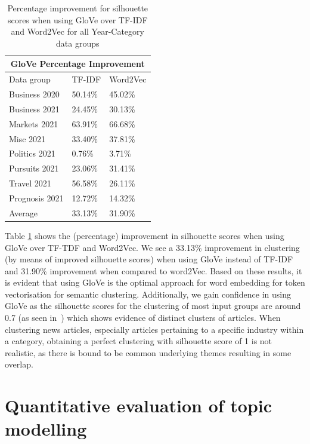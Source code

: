 \begin{table}
\centering
\renewcommand{\arraystretch}{1.05}
\begin{tabularx}{0.7\textwidth}{X X X} 
\multicolumn{3}{c}{GloVe Percentage Improvement} \\
 \hline
 Data group & TF-IDF & Word2Vec \\
 \hline
 Business 2020 & 50.14\% & 45.02\%  \\ 
 Business 2021 & 24.45\% & 30.13\%  \\
 Markets 2021 & 63.91\% & 66.68\% \\
 Misc 2021 & 33.40\% & 37.81\% \\
 Politics 2021 & 0.76\% & 3.71\% \\
 Pursuits 2021 & 23.06\% & 31.41\%  \\ 
 Travel 2021 & 56.58\% & 26.11\% \\
 Prognosis 2021 & 12.72\% & 14.32\% \\ 
 \hline
 Average & 33.13\% & 31.90\% \\ 
\end{tabularx}
\caption{Percentage improvement for silhouette scores when using GloVe over TF-IDF and Word2Vec for all Year-Category data groups}
\label{table:word_embed}
\end{table}

Table \ref{table:word_embed} shows the (percentage) improvement in silhouette scores when using GloVe over TF-TDF and Word2Vec. We see a 33.13\% improvement in clustering (by means of improved silhouette scores) when using GloVe instead of TF-IDF and 31.90\% improvement when compared to word2Vec. Based on these results, it is evident that using GloVe is the optimal approach for word embedding for token vectorisation for semantic clustering. Additionally, we gain confidence in using GloVe as the silhouette scores for the clustering of most input groups are around 0.7 (as seen in~) which shows evidence of distinct clusters of articles. When clustering news articles, especially articles pertaining to a specific industry within a category, obtaining a perfect clustering with silhouette score of 1 is not realistic, as there is bound to be common underlying themes resulting in some overlap.

\section{Quantitative evaluation of topic modelling} \label{s:evaluation_topic_extraction}

